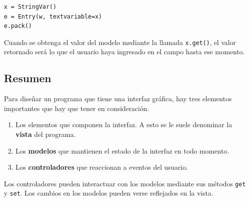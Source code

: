 \begin{lstlisting}
x = StringVar()
e = Entry(w, textvariable=x)
e.pack()
\end{lstlisting}

Cuando se obtenga el valor del modelo mediante la llamada
\lstinline!x.get()!, el valor retornado será lo que el usuario haya
ingresado en el campo hasta ese momento.

\subsection{Resumen}

Para diseñar un programa que tiene una interfaz gráfica, hay tres
elementos importantes que hay que tener en consideración.

\begin{enumerate}
\item
  Los elementos que componen la interfaz. A esto se le suele denominar
  la \textbf{vista} del programa.
\item
  Los \textbf{modelos} que mantienen el estado de la interfaz en todo
  momento.
\item
  Los \textbf{controladores} que reaccionan a eventos del usuario.
\end{enumerate}

Los controladores pueden interactuar con los modelos mediante sus
métodos \lstinline!get! y \lstinline!set!. Los cambios en los modelos
pueden verse reflejados en la vista.
